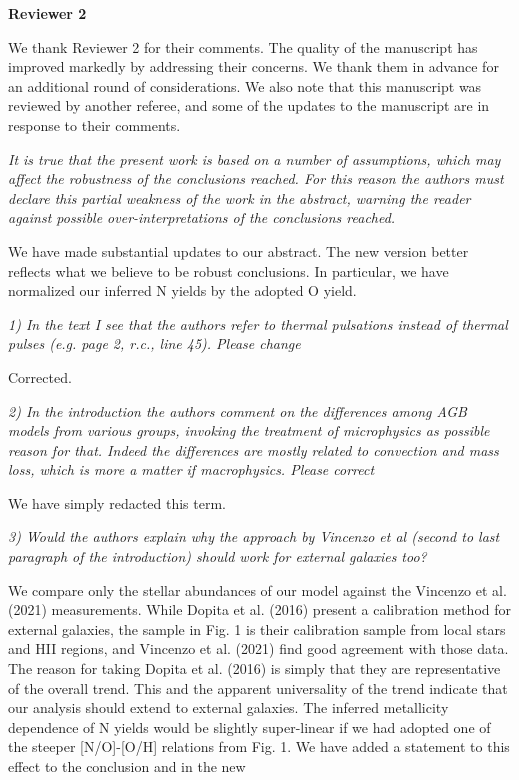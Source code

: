 \documentclass[12pt]{article}
\newcommand\doublebreak[0]{\par\null\par\noindent}
\begin{document}
\newpage
\begin{center}
\textbf{Reviewer 2}
\makebox[\linewidth]{\rule{0.5\textwidth}{0.4pt}}
\end{center}
\par\noindent
We thank Reviewer 2 for their comments.
The quality of the manuscript has improved markedly by addressing their
concerns.
We thank them in advance for an additional round of considerations.
We also note that this manuscript was reviewed by another referee, and some of
the updates to the manuscript are in response to their comments.
\doublebreak
\textit{%
It is true that the present
work is based on a number of assumptions, which may affect the robustness of the
conclusions reached. For this reason the authors must declare this partial
weakness of the work in the abstract, warning the reader against possible
over-interpretations of the conclusions reached.
}
\doublebreak
We have made substantial updates to our abstract.
The new version better reflects what we believe to be robust conclusions.
In particular, we have normalized our inferred N yields by the adopted O yield.
\doublebreak
\textit{%
1) In the text I see that the authors refer to thermal pulsations instead of
thermal pulses (e.g. page 2, r.c., line 45). Please change
}
\doublebreak
Corrected.
\doublebreak
\textit{%
2) In the introduction the authors comment on the differences among AGB models
from various groups, invoking the treatment of microphysics as possible reason
for that.
Indeed the differences are mostly related to convection and mass loss, which is
more a matter if macrophysics. Please correct
}
\doublebreak
We have simply redacted this term.
\doublebreak
\textit{%
3) Would the authors explain why the approach by Vincenzo et al (second to last
paragraph of the introduction) should work for external galaxies too?
}
\doublebreak
We compare only the stellar abundances of our model against the Vincenzo et al.
(2021) measurements.
While Dopita et al. (2016) present a calibration method for external galaxies,
the sample in Fig. 1 is their calibration sample from local stars and HII
regions, and Vincenzo et al. (2021) find good agreement with those data.
The reason for taking Dopita et al. (2016) is simply that they are
representative of the overall trend.
This and the apparent universality of the trend indicate that our analysis
should extend to external galaxies.
The inferred metallicity dependence of N yields would be slightly super-linear
if we had adopted one of the steeper [N/O]-[O/H] relations from Fig. 1.
We have added a statement to this effect to the conclusion and in the new
\end{document}

